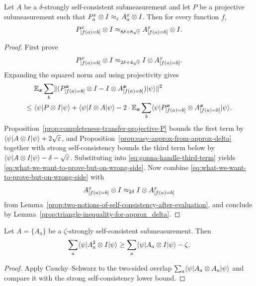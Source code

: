 \begin{lemma}\label{prop:self-consistency-implies-data-processing}
	\leanok
	Let $A$ be a $\delta$-strongly self-consistent submeasurement and let $P$ be a projective submeasurement such that $P_a^x \otimes I \approx_\varepsilon A_a^x \otimes I$. Then for every function $f$,
	\[
		P_{[f(a)=b]}^x \otimes I \approx_{8\delta + 8\sqrt{\varepsilon}} A_{[f(a)=b]}^x \otimes I.
	\]
\end{lemma}
\begin{proof}
	\leanok
	First prove
	\begin{equation}
		P^x_{[f(a)=b]} \otimes I \approx_{2\delta + 4\sqrt{\varepsilon}} I \otimes A_{[f(a)=b]}^x.
		\label{eq:what-we-want-to-prove-but-on-wrong-side}
	\end{equation}
	Expanding the squared norm and using projectivity gives
	\begin{align}
		      & \mathbb{E}_{{\boldsymbol{x}}} \sum_b \lVert(P^{{\boldsymbol{x}}}_{[f(a)=b]} \otimes I - I \otimes A_{[f(a)=b]}^{{\boldsymbol{x}}}) \lvert \psi \rangle \rVert^2 \nonumber \\
		\leq~ & \langle \psi \rvert P \otimes I \lvert \psi \rangle + \langle \psi \rvert I \otimes A \lvert \psi \rangle
		- 2\cdot \mathbb{E}_{{\boldsymbol{x}}} \sum_b \langle \psi \rvert  P^{{\boldsymbol{x}}}_{[f(a)=b]} \otimes A^{{\boldsymbol{x}}}_{[f(a)=b]} \lvert \psi \rangle.
		\label{eq:gonna-handle-third-term}
	\end{align}
	Proposition~\ref{prop:completeness-transfer-projective-P} bounds the first term by $\langle \psi \rvert A \otimes I \lvert \psi \rangle+2\sqrt{\varepsilon}$, and Proposition~\ref{prop:easy-approx-from-approx-delta} together with strong self-consistency bounds the third term below by $\langle \psi \rvert A \otimes I \lvert \psi \rangle-\delta-\sqrt{\varepsilon}$. Substituting into \eqref{eq:gonna-handle-third-term} yields \eqref{eq:what-we-want-to-prove-but-on-wrong-side}. Now combine \eqref{eq:what-we-want-to-prove-but-on-wrong-side} with
	\[
		A^x_{[f(a)=b]} \otimes I \approx_{2\delta} I \otimes A^x_{[f(a)=b]}
	\]
	from Lemma~\ref{prop:two-notions-of-self-consistency-after-evaluation}, and conclude by Lemma~\ref{prop:triangle-inequality-for-approx_delta}.
\end{proof}

\begin{lemma}\label{lem:self-consistency-same-side-square}
	\leanok
	Let $A=\{A_a\}$ be a $\zeta$-strongly self-consistent submeasurement. Then
	\[
		\sum_a \langle \psi \rvert A_a^2 \otimes I \lvert \psi \rangle
		\ge
		\sum_a \langle \psi \rvert A_a \otimes I \lvert \psi \rangle - \zeta.
	\]
\end{lemma}
\begin{proof}
	\leanok
	Apply Cauchy--Schwarz to the two-sided overlap $\sum_a \langle \psi \rvert A_a \otimes A_a \lvert \psi \rangle$ and compare it with the strong self-consistency lower bound.
\end{proof}


